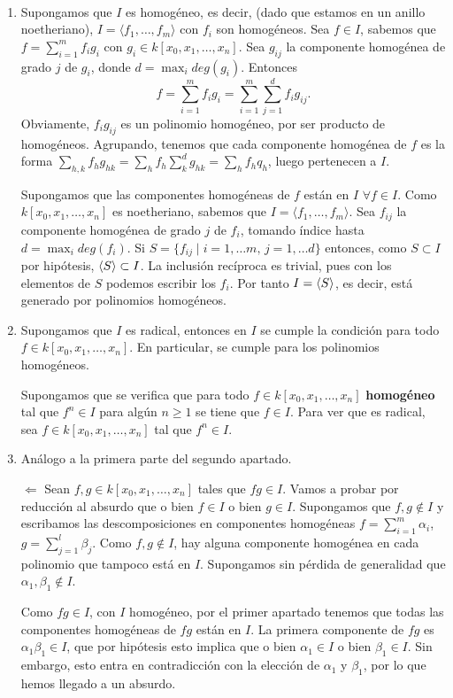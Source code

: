 \documentclass[twoside]{article}
\begin{document}
\begin{solucion}\
\begin{enumerate}
\item Supongamos que $I$ es homogéneo, es decir, (dado que estamos en un anillo noetheriano), $I=\langle f_1,\dots, f_m\rangle$ con $f_i$ son homogéneos. Sea $f\in I$, sabemos que $f=\sum_{i=1}^mf_ig_i$ con $g_i\in k[x_0,x_1,\dots,x_n]$. Sea $g_{ij}$ la componente homogénea de grado $j$ de $g_i$, donde $d=\max_{i} deg(g_i)$. Entonces
$$f=\sum_{i=1}^m f_i g_i= \sum_{i=1}^m\sum_{j=1}^d f_ig_{ij}.$$
Obviamente, $f_i g_{ij}$ es un polinomio homogéneo, por ser producto de homogéneos. Agrupando, tenemos que cada componente homogénea de $f$ es la forma $ \sum_{h,k} f_hg_{hk} = \sum_{h}f_h\sum_{k}^d g_{hk}= \sum_{h}f_h q_h$, luego pertenecen a $I$.

 Supongamos que las componentes homogéneas de $f$ están en $I$ $\forall f \in I$. Como $k[x_0,x_1,\dotsc,x_n]$ es noetheriano, sabemos que $I=\langle f_1,\dots, f_m\rangle$. Sea $f_{ij}$ la componente homogénea de grado $j$ de $f_i$, tomando índice hasta $d=\max_{i} deg(f_i)$. Si $S=\{f_{ij} \mid i=1,\dotsc m,\,j=1,\dotsc d\}$ entonces, como $S\subset I$ por hipótesis, $\langle{S}\rangle \subset I$. La inclusión recíproca es trivial, pues con los elementos de $S$ podemos escribir los $f_i$. Por tanto $I=\langle{S}\rangle$, es decir, está generado por polinomios homogéneos.

\item Supongamos que $I$ es radical, entonces en $I$ se cumple la condición para todo $f\in k[x_0,x_1,\dots,x_n]$. En particular, se cumple para los polinomios homogéneos.

Supongamos que se verifica que para todo $f \in k[x_0, x_1,\dots, x_n]$ \textbf{homogéneo} tal que $f^n \in I$ para algún $n \geq 1$ se tiene que $f \in I$. Para ver que es radical, sea $f \in k[x_0, x_1,\dots, x_n]$ tal que $f^n \in I$.

\item Análogo a la primera parte del segundo apartado.

$\boxed{\Leftarrow}$ Sean $f,g\in k[x_0,x_1,\dots,x_n]$ tales que $fg\in I$. Vamos a probar por reducción al absurdo que o bien $f\in I$ o bien $g\in I$. Supongamos que $f,g\notin I$ y escribamos las descomposiciones en componentes homogéneas $f=\sum_{i=1}^m \alpha_i$, $g=\sum_{j=1}^l\beta_j$. Como $f,g\notin I$, hay alguna componente homogénea en cada polinomio que tampoco está en $I$. Supongamos sin pérdida de generalidad que $\alpha_1,\beta_1\notin I$. 

Como $fg\in I$, con $I$ homogéneo, por el primer apartado tenemos que todas las componentes homogéneas de $fg$ están en $I$. La primera componente de $fg$ es $\alpha_1\beta_1\in I$, que por hipótesis esto implica que o bien $\alpha_1\in I$ o bien $\beta_1\in I$. Sin embargo, esto entra en contradicción con la elección de $\alpha_1$ y $\beta_1$, por lo que hemos llegado a un absurdo.


\end{enumerate}

\end{solucion}
\end{document}
